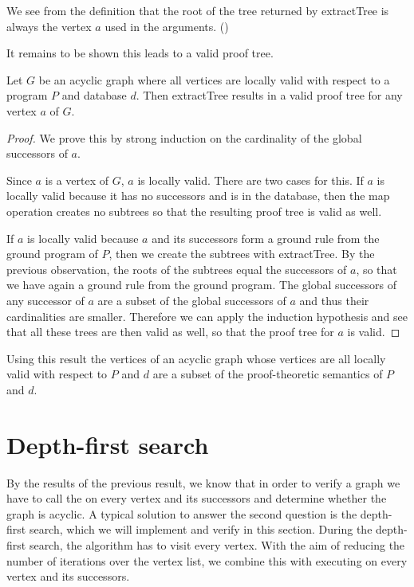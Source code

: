We see from the definition that the root of the tree returned by extractTree is always the vertex $a$ used in the arguments. (\rootOfExtractTree)

It remains to be shown this leads to a valid proof tree.

\begin{lemma}[\extractTreeValidIffAllLocallyValidAndAcyclic]
    Let $G$ be an acyclic graph where all vertices are locally valid with respect to a program $P$ and database $d$. Then extractTree results in a valid proof tree for any vertex $a$ of $G$.
\end{lemma}
\begin{proof}
    We prove this by strong induction on the cardinality of the global successors of $a$.

    Since $a$ is a vertex of $G$, $a$ is locally valid. There are two cases for this. If $a$ is locally valid because it has no successors and is in the database, then the map operation creates no subtrees so that the resulting proof tree is valid as well.

    If $a$ is locally valid because $a$ and its successors form a ground rule from the ground program of $P$, then we create the subtrees with extractTree. By the previous observation, the roots of the subtrees equal the successors of $a$, so that we have again a ground rule from the ground program. The global successors of any successor of $a$ are a subset of the global successors of $a$ and thus their cardinalities are smaller. Therefore we can apply the induction hypothesis and see that all these trees are then valid as well, so that the proof tree for $a$ is valid.
\end{proof}

Using this result the vertices of an acyclic graph whose vertices are all locally valid with respect to $P$ and $d$ are a subset of the proof-theoretic semantics of $P$ and $d$.

\section{Depth-first search}

By the results of the previous result, we know that in order to verify a graph we have to call the \localValidityCheck on every vertex and its successors and determine whether the graph is acyclic. A typical solution to answer the second question is the depth-first search, which we will implement and verify in this section. During the depth-first search, the algorithm has to visit every vertex. With the aim of reducing the number of iterations over the vertex list, we combine this with executing \localValidityCheck on every vertex and its successors.

